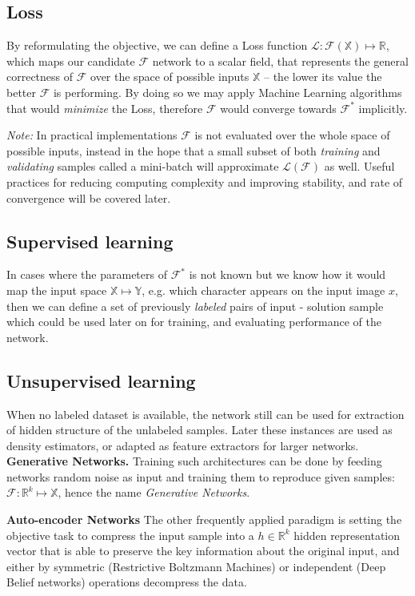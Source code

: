 \subsection{Loss} 
By reformulating the objective, we can define a Loss function $\mathcal{L}:\mathcal{F}(\mathbb{X}) \mapsto \mathbb{R}$,
which maps our candidate $\mathcal{F}$ network to a scalar field, that represents the general correctness of $\mathcal{F}$ over the space of possible inputs $\mathbb{X}$ -- the lower its value the better $\mathcal{F}$ is performing.
By doing so we may apply Machine Learning algorithms that would \emph{minimize} the Loss, therefore $\mathcal{F}$ would converge towards $\mathcal{F}^*$ implicitly.

\emph{Note:} In practical implementations $\mathcal{F}$ is not evaluated over the whole space of possible inputs, instead in the hope that a small subset of both \emph{training} and \emph{validating} samples called a mini-batch will approximate $\mathcal{L}(\mathcal{F})$ as well. Useful practices for reducing computing complexity and improving stability, and rate of convergence will be covered later.


\subsection{Supervised learning}
In cases where the parameters of $\mathcal{F}^*$ is not known but we know how it would map the input space $\mathbb{X} \mapsto \mathbb{Y}$, e.g. which character appears on the input image $x$, then we can define a set of previously \emph{labeled} pairs of input - solution sample which could be used later on for training, and evaluating performance of the network.

\subsection{Unsupervised learning}
When no labeled dataset is available, the network still can be used for extraction of hidden structure of the unlabeled samples. Later these instances are used as density estimators, or adapted as feature extractors for larger networks.
\textbf{Generative Networks.} Training such architectures can be done by feeding networks random noise as input and training them to reproduce given samples: $\mathcal{F}:\mathbb{R}^k \mapsto \mathbb{X}$, hence the name \emph{Generative Networks}.

\textbf{Auto-encoder Networks} The other frequently applied paradigm is setting the objective task to compress the input sample into a $h \in \mathbb{R}^k$ hidden representation vector that is able to preserve the key information about the original input, and either by symmetric (Restrictive Boltzmann Machines) or independent (Deep Belief networks) operations decompress the data.

